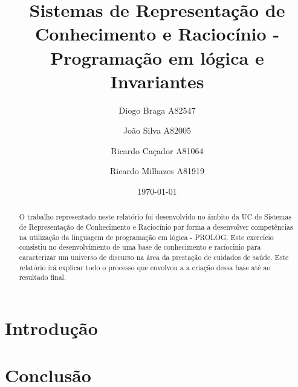 \documentclass[a4paper]{article}
\title{Sistemas de Representação de Conhecimento e Raciocínio - Programação em lógica e Invariantes}
\author{Diogo Braga A82547 \and João Silva A82005 \and Ricardo Caçador A81064 
\and Ricardo Milhazes A81919}
\date{\today}
\begin{document}
\maketitle

\begin{abstract}
O trabalho representado neste relatório foi desenvolvido no âmbito da UC de Sistemas de Representação de Conhecimento e Raciocínio por forma a desenvolver competências na utilização da linguagem de programação em lógica - PROLOG.
Este exercício consistiu no desenvolvimento de uma base de conhecimento e racíocinio para caracterizar um universo de discurso na área da prestação de cuidados de saúde.
Este relatório irá explicar todo o processo que envolvou a a criação dessa base até ao resultado final.
\end{abstract}

\tableofcontents

\newpage


\section{Introdução}
\label{sec:intro}

\section{Conclusão}
\label{sec:conclusao}
\end{document}
